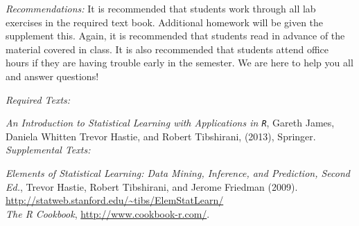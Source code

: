 \documentclass[11pt]{article}
\begin{document}
\emph{Recommendations:} It is recommended that students work through all lab exercises in the required text book. Additional homework will be given the supplement this. Again, it is recommended that students read in advance of the material covered in class. It is also recommended that students attend office hours if they are having trouble early in the semester. We are here to help you all and answer questions! \\

\newpage

\emph{Required Texts:} 

\emph{An Introduction to Statistical Learning with Applications in \texttt{R}}, Gareth James, Daniela Whitten Trevor Hastie, and Robert Tibshirani, (2013), Springer.\\

\emph{Supplemental Texts:} 


\emph{Elements of Statistical Learning: Data Mining, Inference, and Prediction, Second Ed.}, Trevor Hastie, Robert Tibshirani, and Jerome Friedman (2009). \url{http://statweb.stanford.edu/~tibs/ElemStatLearn/}\\

\emph{The R Cookbook}, \url{http://www.cookbook-r.com/}.





\end{document}
